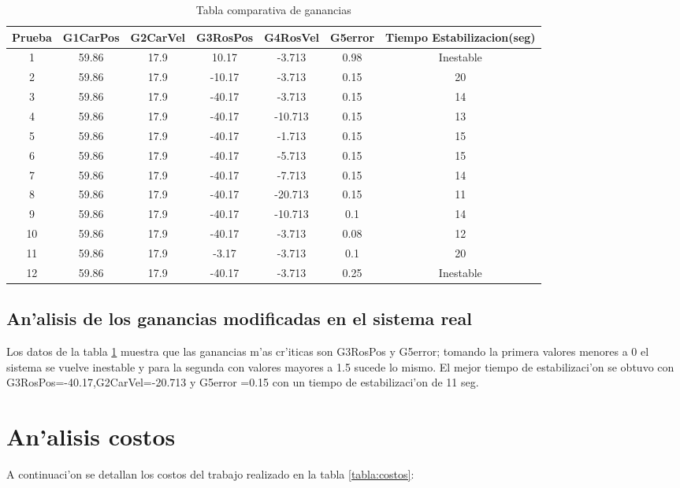 \begin{table}[htbp]
\begin{center}
\begin{tabular}{c c c c c c c}
\hline
Prueba &G1CarPos & G2CarVel& G3RosPos & G4RosVel & G5error& Tiempo Estabilizacion(seg)\\
\hline 
1 &59.86&17.9&10.17&-3.713&0.98& Inestable\\
2 &59.86&17.9&-10.17&-3.713&0.15& 20 \\
3 &59.86&17.9&-40.17&-3.713&0.15& 14 \\
4 &59.86&17.9&-40.17&-10.713&0.15& 13\\
5 &59.86&17.9&-40.17&-1.713&0.15& 15\\
6 &59.86&17.9&-40.17&-5.713&0.15& 15\\
7 &59.86&17.9&-40.17&-7.713&0.15& 14\\
8 &59.86&17.9&-40.17&-20.713&0.15& 11\\
9 &59.86&17.9&-40.17&-10.713&0.1& 14\\
10 &59.86&17.9&-40.17&-3.713&0.08& 12\\
11 &59.86&17.9&-3.17&-3.713&0.1& 20\\
12 &59.86&17.9&-40.17&-3.713&0.25& Inestable\\
\hline 
\end{tabular}
\caption{Tabla comparativa de ganancias}
\label{tabla:pruebag}
\end{center}
\end{table}

\subsection{An'alisis de los ganancias modificadas en el sistema real}
 Los datos de la tabla \ref{tabla:pruebag} muestra que las ganancias m'as cr'iticas son G3RosPos y G5error; tomando la primera valores menores a 0 el sistema se vuelve inestable y para la segunda con valores mayores a 1.5 sucede lo mismo. El mejor tiempo de estabilizaci'on se obtuvo con  G3RosPos=-40.17,G2CarVel=-20.713 y G5error =0.15 con un tiempo de estabilizaci'on de 11 seg. 


\section{An'alisis costos}
A continuaci'on se detallan los costos del trabajo realizado en la tabla \ref{tabla:costos}:

